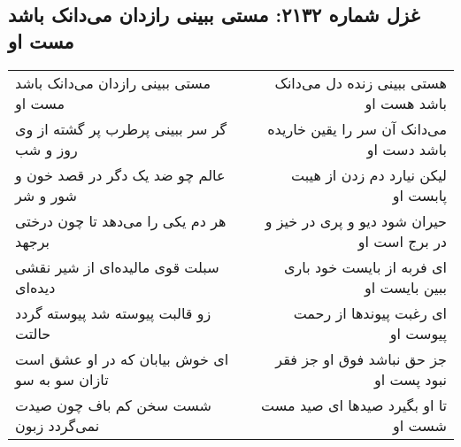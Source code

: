 \begin{center}
\section*{غزل شماره ۲۱۳۲: مستی ببینی رازدان می‌دانک باشد مست او}
\label{sec:2132}
\begin{longtable}{l p{0.5cm} r}
مستی ببینی رازدان می‌دانک باشد مست او
&&
هستی ببینی زنده دل می‌دانک باشد هست او
\\
گر سر ببینی پرطرب پر گشته از وی روز و شب
&&
می‌دانک آن سر را یقین خاریده باشد دست او
\\
عالم چو ضد یک دگر در قصد خون و شور و شر
&&
لیکن نیارد دم زدن از هیبت پابست او
\\
هر دم یکی را می‌دهد تا چون درختی برجهد
&&
حیران شود دیو و پری در خیز و در برج است او
\\
سبلت قوی مالیده‌ای از شیر نقشی دیده‌ای
&&
ای فربه از بایست خود باری ببین بایست او
\\
زو قالبت پیوسته شد پیوسته گردد حالتت
&&
ای رغبت پیوندها از رحمت پیوست او
\\
ای خوش بیابان که در او عشق است تازان سو به سو
&&
جز حق نباشد فوق او جز فقر نبود پست او
\\
شست سخن کم باف چون صیدت نمی‌گردد زبون
&&
تا او بگیرد صیدها ای صید مست شست او
\\
\end{longtable}
\end{center}
